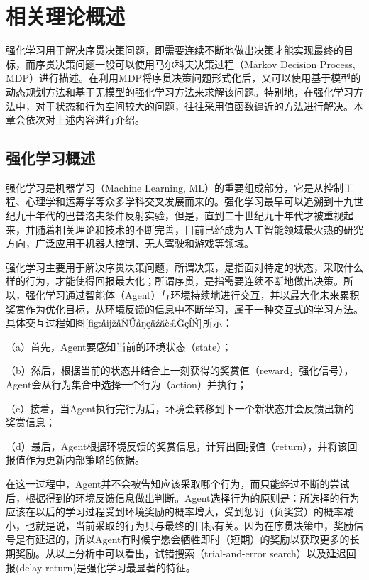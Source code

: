 \chapter{相关理论概述}

强化学习用于解决序贯决策问题，即需要连续不断地做出决策才能实现最终的目标，而序贯决策问题一般可以使用马尔科夫决策过程（Markov Decision Process, MDP）进行描述\citep{强化学习中离策略算法的分析和研究}。在利用MDP将序贯决策问题形式化后，又可以使用基于模型的动态规划方法和基于无模型的强化学习方法来求解该问题。特别地，在强化学习方法中，对于状态和行为空间较大的问题，往往采用值函数逼近的方法进行解决。本章会依次对上述内容进行介绍。

\section{强化学习概述}
强化学习是机器学习（Machine Learning, ML）的重要组成部分，它是从控制工程、心理学和运筹学等众多学科交叉发展而来的。强化学习最早可以追溯到十九世纪九十年代的巴普洛夫条件反射实验，但是，直到二十世纪九十年代才被重视起来，并随着相关理论和技术的不断完善，目前已经成为人工智能领域最火热的研究方向，广泛应用于机器人控制、无人驾驶和游戏等领域\citep{2016连续空间强化学习研究}。

强化学习主要用于解决序贯决策问题，所谓决策，是指面对特定的状态，采取什么样的行为，才能使得回报最大化；所谓序贯，是指需要连续不断地做出决策。所以，强化学习通过智能体（Agent）与环境持续地进行交互，并以最大化未来累积奖赏作为优化目标，从环境反馈的信息中不断学习，属于一种交互式的学习方法。具体交互过程如图$\ref{fig:强化学习过程}$所示：

（a）首先，Agent要感知当前的环境状态（state）；

（b）然后，根据当前的状态并结合上一刻获得的奖赏值（reward，强化信号），Agent会从行为集合中选择一个行为（action）并执行；

（c）接着，当Agent执行完行为后，环境会转移到下一个新状态并会反馈出新的奖赏信息；

（d）最后，Agent根据环境反馈的奖赏信息，计算出回报值（return），并将该回报值作为更新内部策略的依据。

 在这一过程中，Agent并不会被告知应该采取哪个行为，而只能经过不断的尝试后，根据得到的环境反馈信息做出判断。Agent选择行为的原则是：所选择的行为应该在以后的学习过程受到环境奖励的概率增大，受到惩罚（负奖赏）的概率减小，也就是说，当前采取的行为只与最终的目标有关。因为在序贯决策中，奖励信号是有延迟的，所以Agent有时候宁愿会牺牲即时（短期）的奖励以获取更多的长期奖励。从以上分析中可以看出，试错搜索（trial-and-error search）以及延迟回报(delay return)是强化学习最显著的特征\citep{张文旭2017基于事件驱动的多智能体强化学习研究}。

